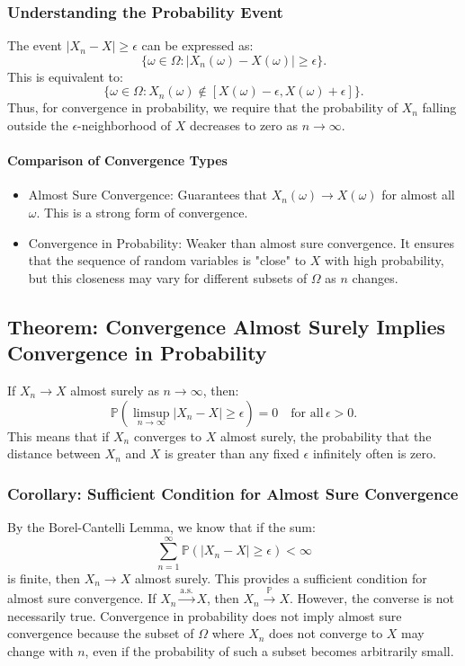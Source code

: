 \subsubsection{Understanding the Probability Event}  
The event \(|X_n - X| \geq \epsilon\) can be expressed as:
\[
\{\omega \in \Omega : |X_n(\omega) - X(\omega)| \geq \epsilon\}.
\]
This is equivalent to:
\[
\{\omega \in \Omega : X_n(\omega) \not\in [X(\omega) - \epsilon, X(\omega) + \epsilon]\}.
\]
Thus, for convergence in probability, we require that the probability of \(X_n\) falling outside the \(\epsilon\)-neighborhood of \(X\) decreases to zero as \(n \to \infty\).  

\paragraph{Comparison of Convergence Types}  
\begin{itemize}  
    \item Almost Sure Convergence: Guarantees that \(X_n(\omega) \to X(\omega)\) for almost all \(\omega\). This is a strong form of convergence.  
    \item Convergence in Probability: Weaker than almost sure convergence. It ensures that the sequence of random variables is "close" to \(X\) with high probability, but this closeness may vary for different subsets of \(\Omega\) as \(n\) changes.  
\end{itemize}  

\subsection{Theorem: Convergence Almost Surely Implies Convergence in Probability}  
If \( X_n \to X \) almost surely as \( n \to \infty \), then:
\[
\mathbb{P} \left( \limsup_{n \to \infty} |X_n - X| \geq \epsilon \right) = 0 \quad \text{for all} \, \epsilon > 0.
\]
This means that if \( X_n \) converges to \( X \) almost surely, the probability that the distance between \( X_n \) and \( X \) is greater than any fixed \( \epsilon \) infinitely often is zero.

\subsubsection{Corollary: Sufficient Condition for Almost Sure Convergence}  
By the Borel-Cantelli Lemma, we know that if the sum:
\[
\sum_{n=1}^{\infty} \mathbb{P} \left( |X_n - X| \geq \epsilon \right) < \infty
\]
is finite, then \( X_n \to X \) almost surely. This provides a sufficient condition for almost sure convergence. If \(X_n \xrightarrow{\text{a.s.}} X\), then \(X_n \xrightarrow{\mathbb{P}} X\). However, the converse is not necessarily true. Convergence in probability does not imply almost sure convergence because the subset of \(\Omega\) where \(X_n\) does not converge to \(X\) may change with \(n\), even if the probability of such a subset becomes arbitrarily small. 

